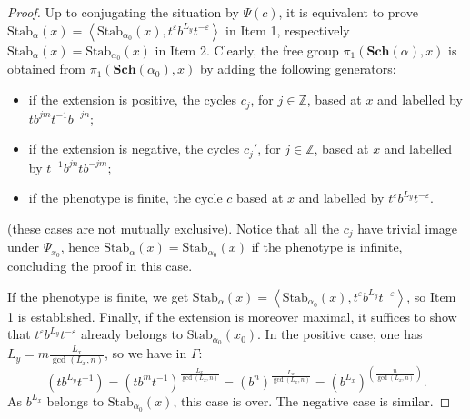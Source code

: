 \documentclass[12pt]{article}
\numberwithin{equation}{section}
\theoremstyle{definition}
\newcommand{\Z}{\mathbb{Z}}
\newcommand{\inv}{^{-1}}
\newcommand{\la}{\left\langle}
\newcommand{\ra}{\right\rangle}
\newcommand{\Stab}{\mathrm{Stab}}
\newcommand{\Sch}{\mathbf{Sch}}
\newcommand\Schreier{\Sch}
\begin{document}
	\begin{proof} 
		Up to conjugating the situation by $\Psi(c)$,
		it is equivalent to prove
		\(\Stab_\alpha(x)=\la \Stab_{\alpha_0}(x), t^\varepsilon b^{L_y} t^{-\varepsilon} \ra\) in Item 1,
		respectively \(\Stab_\alpha(x)=\Stab_{\alpha_0}(x)\) in Item 2.
		Clearly, the free group \(\pi_1(\Schreier(\alpha), x)\) is obtained from $\pi_1(\Schreier(\alpha_0), x)$ by adding the following generators:
		\begin{itemize}
			\item if the extension is positive, the cycles \( c_j \), for \(j\in  \Z\), based at \( x \) and labelled by $t b^{jm} t^{-1} b^{-jn}$;
			\item if the extension is negative, the cycles \( c_j' \), for \(j\in  \Z\), based at \( x \) and labelled by $t\inv b^{jn} t b^{-jm}$;
			\item if the phenotype is finite, the cycle \( c \) based at \( x \) and labelled by $t^\varepsilon b^{L_y} t^{-\varepsilon}$.
		\end{itemize}
		(these cases are not mutually exclusive). 
		Notice that all the \(c_j\) have trivial image under $\Psi_{x_0}$,
		hence \(\Stab_\alpha(x)=\Stab_{\alpha_0}(x)\) if the phenotype is infinite, concluding the proof in this case.

		If the phenotype is finite, 
		we get \(\Stab_\alpha(x)=\la \Stab_{\alpha_0}(x), t^\varepsilon b^{L_y} t^{-\varepsilon} \ra\),
		so Item 1 is established.
		Finally, if the extension is moreover maximal, 
		it suffices to show that $t^\varepsilon b^{L_y} t^{-\varepsilon}$ 
		already belongs to $\Stab_{\alpha_0}(x_0)$.
		In the positive case, one has \( L_y=m\frac{L_x}{\gcd(L_x,n)} \), 
		so we have in \( \Gamma \):
		\[\left(t b^{L_y} t^{-1}\right)=(t b^mt^{-1})^{\frac{L_x}{\gcd(L_x,n)} }=(b^n)^{\frac{L_x}{\gcd(L_x,n)} }
		=(b^{L_x})^{\left(\frac{n}{\gcd(L_x,n)}\right)}.\]
		As \(b^{L_x}\) belongs to \( \Stab_{\alpha_0}(x) \), this case is over.
		The negative case is similar.
	\end{proof}
\end{document}
